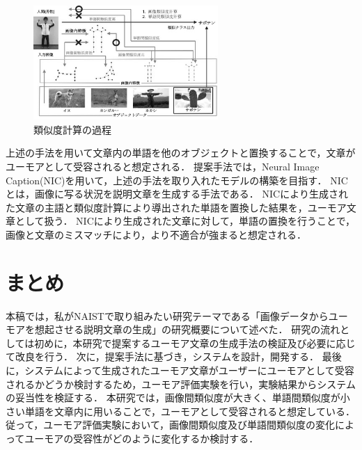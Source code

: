 \documentclass[twocolumn,2pt]{jarticle}
\begin{document}
\begin{figure}
	\begin{center}
		\includegraphics[width=7cm]{images/flow_gray.jpg}
		\caption{類似度計算の過程}
		\label{fig:flow}
	\end{center}
\end{figure}



上述の手法を用いて文章内の単語を他のオブジェクトと置換することで，文章がユーモアとして受容されると想定される．
提案手法では，Neural Image Caption(NIC)\cite{NIC}を用いて，上述の手法を取り入れたモデルの構築を目指す．
NICとは，画像に写る状況を説明文章を生成する手法である．
NICにより生成された文章の主語と類似度計算により導出された単語を置換した結果を，ユーモア文章として扱う．
NICにより生成された文章に対して，単語の置換を行うことで，画像と文章のミスマッチにより，より不適合が強まると想定される．









\section{まとめ}
本稿では，私がNAISTで取り組みたい研究テーマである「画像データからユーモアを想起させる説明文章の生成」の研究概要について述べた．
研究の流れとしては初めに，本研究で提案するユーモア文章の生成手法の検証及び必要に応じて改良を行う．
次に，提案手法に基づき，システムを設計，開発する．
最後に，システムによって生成されたユーモア文章がユーザーにユーモアとして受容されるかどうか検討するため，ユーモア評価実験を行い，実験結果からシステムの妥当性を検証する．
本研究では，画像間類似度が大きく、単語間類似度が小さい単語を文章内に用いることで，ユーモアとして受容されると想定している．
従って，ユーモア評価実験において，画像間類似度及び単語間類似度の変化によってユーモアの受容性がどのように変化するか検討する．




\end{document}
